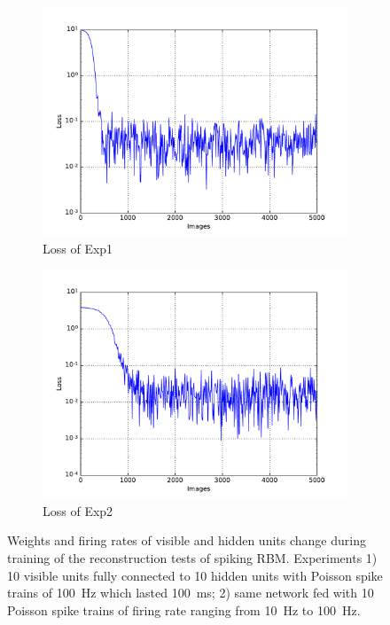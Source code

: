 \begin{figure}
\begin{subfigure}[t]{0.4\textwidth}
		\includegraphics[width=\textwidth]{pics_sdlm/17_exp_SRBM_all_long/exp1_mse_nons.pdf}
		\caption{Loss of Exp1}
	\end{subfigure}
	\begin{subfigure}[t]{0.4\textwidth}
		\includegraphics[width=\textwidth]{pics_sdlm/17_exp_SRBM_all_long/exp2_mse_nons.pdf}
		\caption{Loss of Exp2}
	\end{subfigure}
	\caption{Weights and firing rates of visible and hidden units change during training of the reconstruction tests of spiking RBM. 
		Experiments 1) 10 visible units fully connected to 10 hidden units with Poisson spike trains of 100~Hz which lasted 100~ms; 2) same network fed with 10 Poisson spike trains of firing rate ranging from 10~Hz to 100~Hz.}
\end{figure}

